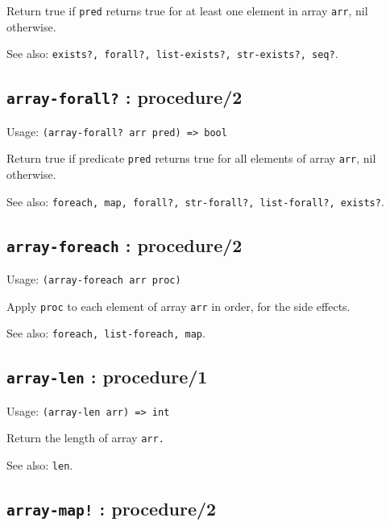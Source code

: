 \documentclass[
]{article}
\newcommand{\passthrough}[1]{#1}
\begin{document}
Return true if \passthrough{\lstinline!pred!} returns true for at least
one element in array \passthrough{\lstinline!arr!}, nil otherwise.

See also:
\passthrough{\lstinline!exists?, forall?, list-exists?, str-exists?, seq?!}.

\hypertarget{array-forall-procedure2-1}{%
\subsection{\texorpdfstring{\texttt{array-forall?} :
procedure/2}{array-forall? : procedure/2}}\label{array-forall-procedure2-1}}

Usage: \passthrough{\lstinline!(array-forall? arr pred) => bool!}

Return true if predicate \passthrough{\lstinline!pred!} returns true for
all elements of array \passthrough{\lstinline!arr!}, nil otherwise.

See also:
\passthrough{\lstinline!foreach, map, forall?, str-forall?, list-forall?, exists?!}.

\hypertarget{array-foreach-procedure2-1}{%
\subsection{\texorpdfstring{\texttt{array-foreach} :
procedure/2}{array-foreach : procedure/2}}\label{array-foreach-procedure2-1}}

Usage: \passthrough{\lstinline!(array-foreach arr proc)!}

Apply \passthrough{\lstinline!proc!} to each element of array
\passthrough{\lstinline!arr!} in order, for the side effects.

See also: \passthrough{\lstinline!foreach, list-foreach, map!}.

\hypertarget{array-len-procedure1-1}{%
\subsection{\texorpdfstring{\texttt{array-len} :
procedure/1}{array-len : procedure/1}}\label{array-len-procedure1-1}}

Usage: \passthrough{\lstinline!(array-len arr) => int!}

Return the length of array \passthrough{\lstinline!arr.!}

See also: \passthrough{\lstinline!len!}.

\hypertarget{array-map-procedure2-1}{%
\subsection{\texorpdfstring{\texttt{array-map!} :
procedure/2}{array-map! : procedure/2}}\label{array-map-procedure2-1}}
\end{document}
